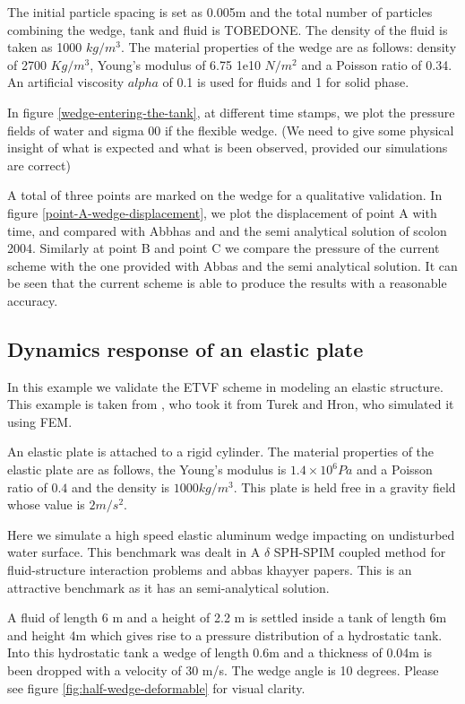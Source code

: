\documentclass[preprint,12pt]{elsarticle}
\begin{document}
The initial particle spacing is set as 0.005m and the total number of
particles combining the wedge, tank and fluid is TOBEDONE. The density of the
fluid is taken as 1000 $kg/m^3$. The material properties of the wedge are as
follows: density of 2700 $Kg/m^3$, Young's modulus of 6.75 1e10 $N/m^2$ and a
Poisson ratio of 0.34. An artificial viscosity $alpha$ of 0.1 is used for
fluids and 1 for solid phase.

In figure \ref{wedge-entering-the-tank}, at different time stamps, we plot the
pressure fields of water and sigma 00 if the flexible wedge. (We need to give
some physical insight of what is expected and what is been observed, provided
our simulations are correct)



A total of three points are marked on the wedge for a qualitative validation.
In figure \ref{point-A-wedge-displacement}, we plot the displacement of point
A with time, and compared with Abbhas and and the semi analytical solution of
scolon 2004. Similarly at point B and point C we compare the pressure of the
current scheme with the one provided with Abbas and the semi analytical
solution. It can be seen that the current scheme is able to produce the
results with a reasonable accuracy.




\subsection{Dynamics response of an elastic plate}
\label{sec:elastic-plate}

In this example we validate the ETVF scheme in modeling an elastic structure.
This example is taken from \cite{Sun2019study}, who took it from Turek and
Hron, who simulated it using FEM.

An elastic plate is attached to a rigid cylinder. The material properties of
the elastic plate are as follows, the Young's modulus is $1.4\times10^6Pa$ and
a Poisson ratio of $0.4$ and the density is $1000 kg/m^3$. This plate is held
free in a gravity field whose value is $2m/s^2$.


Here we simulate a high speed elastic aluminum wedge impacting on undisturbed
water surface. This benchmark was dealt in
{A $\delta$ SPH-SPIM coupled method for fluid-structure interaction problems} and
{abbas khayyer} papers.
This is an attractive benchmark as it has an semi-analytical solution.

A fluid of length 6 m and a height of 2.2 m is settled inside a tank of length
6m and height 4m which gives rise to a pressure distribution of a hydrostatic
tank. Into this hydrostatic tank a wedge of length 0.6m and a thickness of
0.04m is been dropped with a velocity of 30 m/s. The wedge angle is 10
degrees. Please see figure \ref{fig:half-wedge-deformable} for visual clarity.
\end{document}
